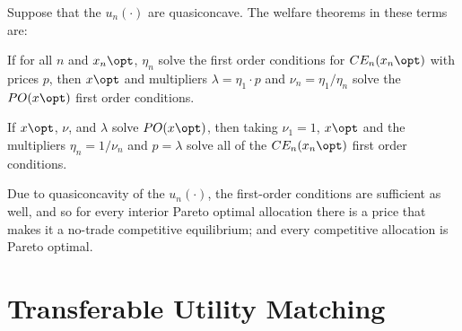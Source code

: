 \documentclass[10pt]{article}
\begin{document}
Suppose that the $u_n(\cdot)$ are quasiconcave. The welfare theorems in these terms are:
\begin{theorem}
	 If for all $n$ and $x_n\opt$, $\eta_n$ solve the first order conditions for $CE_n(x_n\opt)$ with prices $p$, then $x\opt$ and multipliers $\lambda = \eta_1 \cdot p$ and $\nu_n = \eta_1 / \eta_n$ solve the $PO(x\opt)$ first order conditions.
\end{theorem}
\begin{theorem}
	 If $x\opt$, $\nu$, and $\lambda$ solve $PO(x\opt)$, then taking $\nu_1 = 1$, $x\opt$ and the multipliers $\eta_n = 1/\nu_n$ and $p = \lambda$ solve all of the $CE_n(x_n\opt)$ first order conditions. 
\end{theorem}
Due to quasiconcavity of the $u_n(\cdot)$, the first-order conditions are sufficient as well, and so for every interior Pareto optimal allocation there is a price that makes it a no-trade competitive equilibrium; and every competitive allocation is Pareto optimal.



\section{Transferable Utility Matching}
\end{document}
